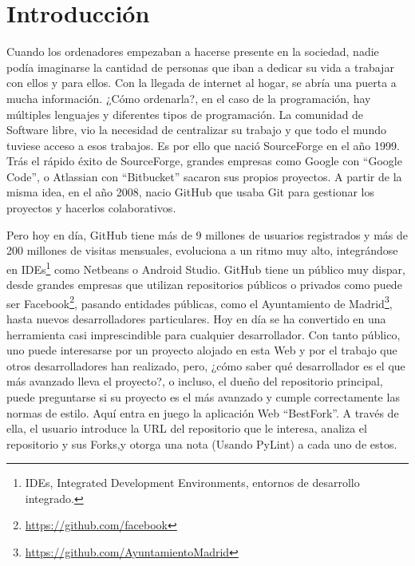 \documentclass[a4paper, 12pt]{book}
\begin{document}
\cleardoublepage
\chapter{Introducción}
\label{sec:intro} %

Cuando los ordenadores empezaban a hacerse presente en la sociedad, nadie podía imaginarse la cantidad de personas que iban a dedicar su vida a trabajar con ellos y para ellos. Con la llegada de internet al hogar, se abría una puerta a mucha información. ¿Cómo ordenarla?, en el caso de la programación, hay múltiples lenguajes y diferentes tipos de programación.
La comunidad de Software libre, vio la necesidad de centralizar su trabajo y que todo el mundo tuviese acceso a esos trabajos. Es por ello que nació SourceForge en el año 1999. Trás el rápido éxito de SourceForge, grandes empresas como Google con ``Google Code'', o Atlassian con ``Bitbucket'' sacaron sus propios proyectos. A partir de la misma idea, en el año 2008, nacio GitHub que usaba Git para gestionar los proyectos y hacerlos colaborativos.

Pero hoy en día, GitHub tiene más de 9 millones de usuarios registrados y más de 200 millones de visitas mensuales, evoluciona a un ritmo muy alto, integrándose en IDEs\footnote{IDEs, Integrated Development Environments, entornos de desarrollo integrado.} como Netbeans o Android Studio. GitHub tiene un público muy dispar, desde grandes empresas que utilizan repositorios públicos o privados como puede ser Facebook\footnote{\url{https://github.com/facebook}}, pasando entidades públicas, como el Ayuntamiento de Madrid\footnote{\url{https://github.com/AyuntamientoMadrid}}, hasta nuevos desarrolladores particulares. Hoy en día se ha convertido en una herramienta casi imprescindible para cualquier desarrollador.
Con tanto público, uno puede interesarse por un proyecto alojado en esta Web y por el trabajo que otros desarrolladores han realizado, pero, ¿cómo saber qué desarrollador es el que más avanzado lleva el proyecto?, o incluso, el dueño del repositorio principal, puede preguntarse si su proyecto es el más avanzado y cumple correctamente las normas de estilo.
Aquí entra en juego la aplicación Web ``BestFork''. A través de ella, el usuario introduce la URL del repositorio que le interesa, analiza el repositorio y sus Forks,y otorga una nota (Usando PyLint) a cada uno de estos.
\end{document}
